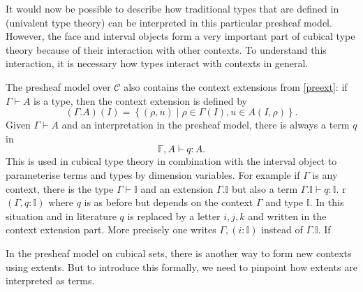 \documentclass[11pt,a4paper,twoside,xetex,draft]{book}
\begin{document}
It would now be possible to describe how traditional types that are defined in (univalent type theory) can be interpreted in this particular presheaf model. However, the face and interval objects form a very important part of cubical type theory because of their interaction with other contexts. To understand this interaction, it is necessary how types interact with contexts in general.  

The presheaf model over $\mathcal{C}$ also contains the context extensions from \cref{preext}: if $\Gamma \vdash A$ is a type, then the context extension is defined by $$(\Gamma . A)(I) = \left\{ (\rho , u ) \mid \rho \in \Gamma (I), u \in A (I,\rho) \right\}.$$
Given $\Gamma \vdash A$ and an interpretation in the presheaf model, there is always a term $q$ in $$\mathbb{\Gamma}, A \vdash q : A.$$ This is used in cubical type theory in combination with the interval object to parameterise terms and types by dimension variables. For example if $\Gamma$ is any context, there is the type $\Gamma \vdash \mathbb{I}$ and an extension $\Gamma. \mathbb{I}$ but also a term $\Gamma. \mathbb{I} \vdash q : \mathbb{I}$.
r $(\Gamma, q : \mathbb{I})$ where $q$ is as before but depends on the context $\Gamma$ and type $\mathbb{I}$. In this situation and in literature $q$ is replaced by a letter $i,j,k$ and written in the context extension part. More precisely one writes $\Gamma, (i: \mathbb{I})$ instead of $\Gamma . \mathbb{I}$. If 

In the presheaf model on cubical sets, there is another way to form new contexts using extents. But to introduce this formally, we need to pinpoint how extents are interpreted as terms.
\end{document}
